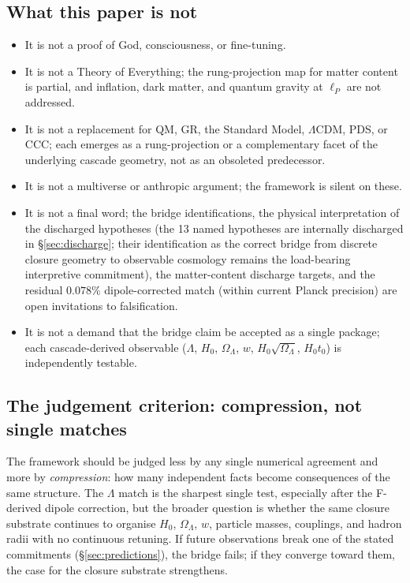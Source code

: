 \documentclass[11pt]{article}
\theoremstyle{plain}
\theoremstyle{definition}
\theoremstyle{remark}
\begin{document}
\subsection{What this paper is not}

\begin{itemize}[leftmargin=2em]
\item It is not a proof of God, consciousness, or fine-tuning.
\item It is not a Theory of Everything; the rung-projection map for matter content is partial, and inflation, dark matter, and quantum gravity at $\ell_P$ are not addressed.
\item It is not a replacement for QM, GR, the Standard Model, $\Lambda$CDM, PDS, or CCC; each emerges as a rung-projection or a complementary facet of the underlying cascade geometry, not as an obsoleted predecessor.
\item It is not a multiverse or anthropic argument; the framework is silent on these.
\item It is not a final word; the bridge identifications, the physical interpretation of the discharged hypotheses (the 13 named hypotheses are internally discharged in \S\ref{sec:discharge}; their identification as the correct bridge from discrete closure geometry to observable cosmology remains the load-bearing interpretive commitment), the matter-content discharge targets, and the residual $0.078\%$ dipole-corrected match (within current Planck precision) are open invitations to falsification.
\item It is not a demand that the bridge claim be accepted as a single package; each cascade-derived observable ($\Lambda$, $H_0$, $\Omega_\Lambda$, $w$, $H_0 \sqrt{\Omega_\Lambda}$, $H_0 t_0$) is independently testable.
\end{itemize}

\subsection{The judgement criterion: compression, not single matches}\label{sec:discussion-compression}

The framework should be judged less by any single numerical agreement and more by \emph{compression}: how many independent facts become consequences of the same structure. The $\Lambda$ match is the sharpest single test, especially after the F-derived dipole correction, but the broader question is whether the same closure substrate continues to organise $H_0$, $\Omega_\Lambda$, $w$, particle masses, couplings, and hadron radii with no continuous retuning. If future observations break one of the stated commitments (\S\ref{sec:predictions}), the bridge fails; if they converge toward them, the case for the closure substrate strengthens.
\end{document}
